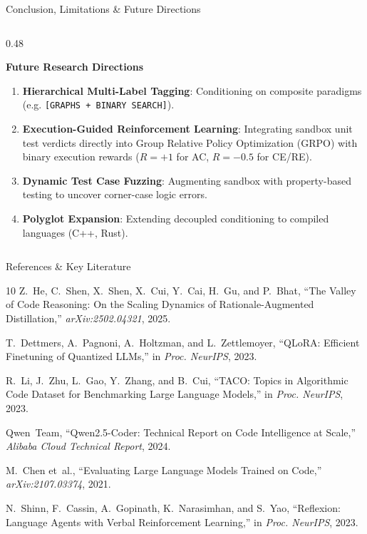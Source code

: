 \documentclass[aspectratio=169,10pt]{beamer}
\begin{document}
\begin{frame}{Conclusion, Limitations \& Future Directions}
\begin{columns}[T]
    \begin{column}{0.48\textwidth}
      \begin{exampleblock}{\textbf{Future Research Directions}}
        \begin{enumerate}\itemsep=3pt\scriptsize
          \item \textbf{Hierarchical Multi-Label Tagging}: Conditioning on composite paradigms (e.g. \texttt{[GRAPHS + BINARY SEARCH]}).
          \item \textbf{Execution-Guided Reinforcement Learning}: Integrating sandbox unit test verdicts directly into Group Relative Policy Optimization (GRPO) with binary execution rewards ($R=+1$ for AC, $R=-0.5$ for CE/RE).
          \item \textbf{Dynamic Test Case Fuzzing}: Augmenting sandbox with property-based testing to uncover corner-case logic errors.
          \item \textbf{Polyglot Expansion}: Extending decoupled conditioning to compiled languages (C++, Rust).
        \end{enumerate}
      \end{exampleblock}
    \end{column}
  \end{columns}
\end{frame}

\begin{frame}{References \& Key Literature}
  \begin{thebibliography}{10}
    \tiny
    Z.~He, C.~Shen, X.~Shen, X.~Cui, Y.~Cai, H.~Gu, and P.~Bhat,
    \newblock ``The Valley of Code Reasoning: On the Scaling Dynamics of Rationale-Augmented Distillation,''
    \newblock \textit{arXiv:2502.04321}, 2025.

    T.~Dettmers, A.~Pagnoni, A.~Holtzman, and L.~Zettlemoyer,
    \newblock ``QLoRA: Efficient Finetuning of Quantized LLMs,''
    \newblock in \textit{Proc. NeurIPS}, 2023.

    R.~Li, J.~Zhu, L.~Gao, Y.~Zhang, and B.~Cui,
    \newblock ``TACO: Topics in Algorithmic Code Dataset for Benchmarking Large Language Models,''
    \newblock in \textit{Proc. NeurIPS}, 2023.

    Qwen~Team,
    \newblock ``Qwen2.5-Coder: Technical Report on Code Intelligence at Scale,''
    \newblock \textit{Alibaba Cloud Technical Report}, 2024.

    M.~Chen et~al.,
    \newblock ``Evaluating Large Language Models Trained on Code,''
    \newblock \textit{arXiv:2107.03374}, 2021.

    N.~Shinn, F.~Cassin, A.~Gopinath, K.~Narasimhan, and S.~Yao,
    \newblock ``Reflexion: Language Agents with Verbal Reinforcement Learning,''
    \newblock in \textit{Proc. NeurIPS}, 2023.
  \end{thebibliography}
\end{frame}
\end{document}
